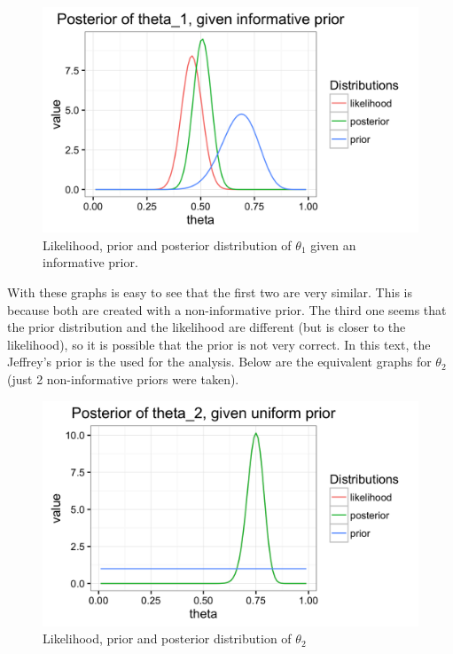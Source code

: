 \documentclass{article}
\begin{document}
\begin{figure}[ht!]
    \centering
    \includegraphics[scale=.18]{11_Assignment1/theta1_c3_posterior.png}
    \caption{Likelihood, prior and posterior distribution of $\theta_1$ given an informative prior.}
    \label{fig:fig4}
\end{figure}

\newpage
With these graphs is easy to see that the first two are very similar. This is because both are created with a non-informative prior. The third one seems that the prior distribution and the likelihood are different (but is closer to the likelihood), so it is possible that the prior is not very correct. In this text, the Jeffrey's prior is the used for the analysis. Below are the equivalent graphs for $\theta_2$ (just 2 non-informative priors were taken).

\begin{figure}[ht!]
    \centering
    \includegraphics[scale=.20]{11_Assignment1/theta2_c1_posterior.png}
    \caption{Likelihood, prior and posterior distribution of $\theta_2$}
    \label{fig:fig5}
\end{figure}
\end{document}
